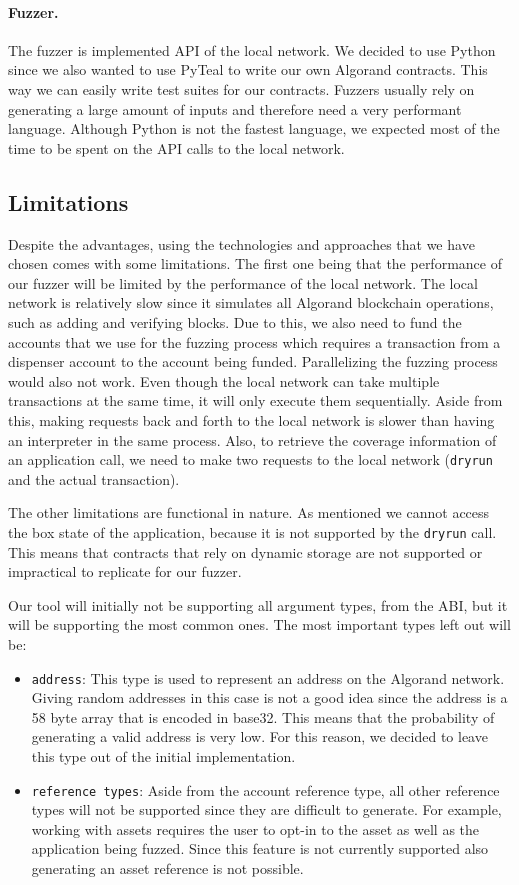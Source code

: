 \paragraph*{Fuzzer.} The fuzzer is implemented \acs{API} of the local network.
We decided to use Python since we also wanted to use PyTeal to write our own Algorand contracts.
This way we can easily write test suites for our contracts.
Fuzzers usually rely on generating a large amount of inputs and therefore need a very performant language.
Although Python is not the fastest language, we expected most of the time to be spent on the \acs{API} calls to the local network.

\subsection*{Limitations}
Despite the advantages, using the technologies and approaches that we have chosen comes with some limitations.
The first one being that the performance of our fuzzer will be limited by the performance of the local network.
The local network is relatively slow since it simulates all Algorand blockchain operations, such as adding and verifying blocks.
Due to this, we also need to fund the accounts that we use for the fuzzing process which requires a transaction from a dispenser account to the account being funded.
Parallelizing the fuzzing process would also not work.
Even though the local network can take multiple transactions at the same time, it will only execute them sequentially.
Aside from this, making requests back and forth to the local network is slower than having an interpreter in the same process.
Also, to retrieve the coverage information of an application call, we need to make two requests to the local network (\texttt{dryrun} and the actual transaction).

The other limitations are functional in nature.
As mentioned we cannot access the box state of the application, because it is not supported by the \texttt{dryrun} call.
This means that contracts that rely on dynamic storage are not supported or impractical to replicate for our fuzzer.

Our tool will initially not be supporting all argument types, from the \ac{ABI}, but it will be supporting the most common ones.
The most important types left out will be:
\begin{itemize}
    \item \texttt{address}: This type is used to represent an address on the Algorand network.
          Giving random addresses in this case is not a good idea since the address is a 58 byte array that is encoded in base32.
          This means that the probability of generating a valid address is very low. For this reason, we decided to leave this type out of the initial implementation.
    \item \texttt{reference types}: Aside from the account reference type, all other reference types will not be supported since they are difficult to generate.
          For example, working with assets requires the user to opt-in to the asset as well as the application being fuzzed.
          Since this feature is not currently supported also generating an asset reference is not possible.
\end{itemize}

